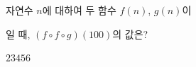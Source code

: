 자연수 $n$에 대하여 두 함수 $f(n)$, $g(n)$이 \par\smallskip{}\par\smallskip\noindent 일 때, $(f\circ f\circ g)(100)$의 값은?
\begin{choices32}{$2$}{$3$}{$4$}{$5$}{$6$}\end{choices32}
